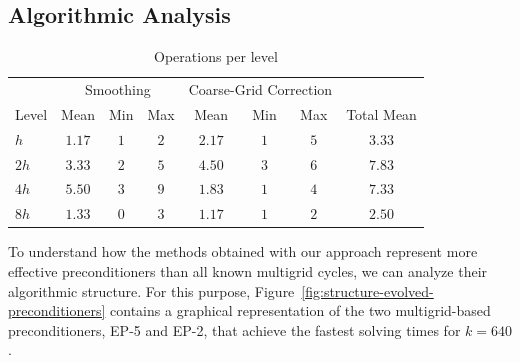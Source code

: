 \subsection{Algorithmic Analysis}
\begin{table}
	\caption{Operations per level}
	\label{table:operations-per-level}
	\centering
	\begin{tabular}{l c c c c c c c}
		\toprule
  		& \multicolumn{3}{c}{Smoothing} & \multicolumn{3}{c}{Coarse-Grid Correction} & \\
		\cmidrule(l){2-4} \cmidrule(l){5-7}
		Level & Mean & Min & Max & Mean & Min & Max & Total Mean \\
        \midrule
        $h$ & $1.17$ & $1$ & $2$ & $2.17$ & $1$ & $5$ & $3.33$\\
        \midrule
        $2h$ & $3.33$ & $2$ & $5$ & $4.50$ & $3$ & $6$ & $7.83$ \\
        \midrule
        $4h$ & $5.50$ & $3$ & $9$ & $1.83$ & $1$ & $4$ & $7.33$ \\
        \midrule
        $8h$ & $1.33$ & $0$ & $3$ & $1.17$ & $1$ & $2$ & $2.50$ \\
		\bottomrule
	\end{tabular}
\end{table}
To understand how the methods obtained with our approach represent more effective preconditioners than all known multigrid cycles, we can analyze their algorithmic structure.
For this purpose, Figure~\ref{fig:structure-evolved-preconditioners} contains a graphical representation of the two multigrid-based preconditioners, EP-5 and EP-2, that achieve the fastest solving times for $k = 640$.
